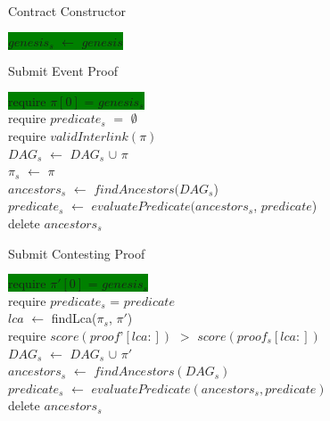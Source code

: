 \begin{algorithm}[H]
    \caption{Contract Constructor}
    \label{algo:avoid_premining_ctor}
    \colorbox{green}{$genesis_{s}$ $\leftarrow$ $genesis$}
    \newline
\end{algorithm}
\vspace{0.1cm}
\begin{algorithm}[H]
    \caption{Submit Event Proof}
    \label{algo:avoid_premining_submit}
    \colorbox{green}{require $\pi[0]$ = $genesis_{s}$ }\\
    require $predicate_{s}$ $=$ $\emptyset$ \\
    require $validInterlink(\pi)$\\
    $DAG_{s}$ $\leftarrow$ $DAG_{s}$ $\cup$ $\pi$\\
    $\pi_{s}$ $\leftarrow$ $\pi$\\
    $ancestors_{s}$ $\leftarrow$ $findAncestors(DAG_{s}$)\\
    $predicate_{s}$ $\leftarrow$ $evaluatePredicate(ancestors_{s}$,
    $predicate$)\\
    delete $ancestors_{s}$\\
\end{algorithm}
\vspace{0.1cm}
\begin{algorithm}
    \caption{Submit Contesting Proof}
    \label{algo:avoid_premining_contest}
    \colorbox{green}{require $\pi'[0]$ = $genesis_{s}$ }\\
    require $predicate_{s}$ = $predicate$\\
    $lca$ $\leftarrow$ findLca($\pi_{s}$, $\pi'$)\\
    require $score(proof’[lca:])$ $>$ $score(proof_{s}[lca:])$ \\
    $DAG_{s}$ $\leftarrow$ $DAG_{s}$ $\cup$ $\pi'$\\
    $ancestors_{s}$ $\leftarrow$ $findAncestors(DAG_{s})$\\
    $predicate_{s}$ $\leftarrow$ $evaluatePredicate(ancestors_{s},
    predicate)$\\
    delete $ancestors_{s}$\\
\end{algorithm}
